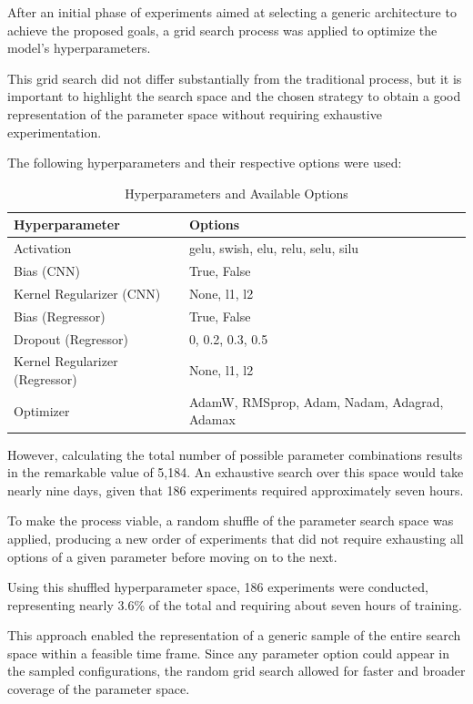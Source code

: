 \documentclass[sigconf,natbib=false]{acmart}
\begin{document}
After an initial phase of experiments aimed at selecting a generic architecture to achieve the proposed goals, a grid search process was applied to optimize the model’s hyperparameters.

This grid search did not differ substantially from the traditional process, but it is important to highlight the search space and the chosen strategy to obtain a good representation of the parameter space without requiring exhaustive experimentation.

The following hyperparameters and their respective options were used:

\begin{table}
  \caption{Hyperparameters and Available Options}
  \label{tab:hyperparams_options}
  \begin{tabular}{ll}
    \toprule
    Hyperparameter & Options \\
    \midrule
    Activation & gelu, swish, elu, relu, selu, silu \\
    Bias (CNN) & True, False \\
    Kernel Regularizer (CNN) & None, l1, l2 \\
    Bias (Regressor) & True, False \\
    Dropout (Regressor) & 0, 0.2, 0.3, 0.5 \\
    Kernel Regularizer (Regressor) & None, l1, l2 \\
    Optimizer & AdamW, RMSprop, Adam, Nadam, Adagrad, Adamax \\
    \bottomrule
  \end{tabular}
\end{table}

However, calculating the total number of possible parameter combinations results in the remarkable value of 5,184. An exhaustive search over this space would take nearly nine days, given that 186 experiments required approximately seven hours.

To make the process viable, a random shuffle of the parameter search space was applied, producing a new order of experiments that did not require exhausting all options of a given parameter before moving on to the next.

Using this shuffled hyperparameter space, 186 experiments were conducted, representing nearly 3.6\% of the total and requiring about seven hours of training.

This approach enabled the representation of a generic sample of the entire search space within a feasible time frame. Since any parameter option could appear in the sampled configurations, the random grid search allowed for faster and broader coverage of the parameter space.
\end{document}
